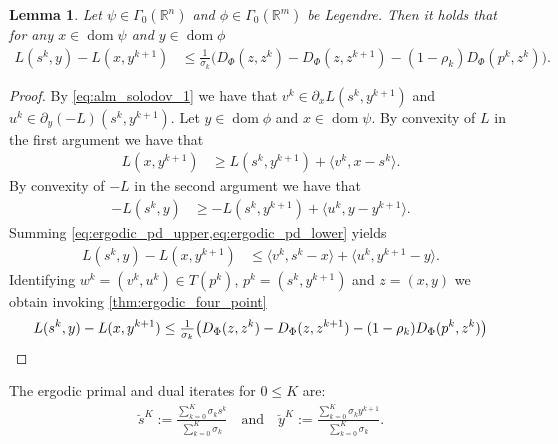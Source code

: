 \documentclass[11pt,onecolumn]{article}
\DeclareMathOperator{\dom}{dom}
\newcommand{\bR}{\mathbb{R}}
\newtheorem{lemma}[lemma]{Lemma}
\theoremstyle{remark}
\begin{document}
\begin{lemma} \label{thm:ergodic_pd_fixed}
    Let $\psi \in \Gamma_0(\bR^n)$ and $\phi \in \Gamma_0(\bR^m)$ be Legendre. Then it holds that for any $x \in \dom \psi$ and $y \in \dom \phi$
\begin{align}
    L(s^{k}, y) -L(x, y^{k+1})&\leq \tfrac{1}{\sigma_k}\big(D_\Phi(z,z^k) -  D_\Phi(z,z^{k+1}) - (1-\rho_k) D_\Phi(p^k,z^{k})\big).
\end{align}
\end{lemma}
\begin{proof}
By \cref{eq:alm_solodov_1} we have that $v^{k} \in \partial_x L(s^{k}, y^{k+1})$ and $u^{k} \in \partial_y (-L)(s^{k}, y^{k+1})$. 
Let $y \in \dom \phi$ and $x \in\dom \psi$. By convexity of $L$ in the first argument we have that
\begin{align} \label{eq:ergodic_pd_upper}
L(x, y^{k+1}) &\geq L(s^{k}, y^{k+1}) + \langle v^{k}, x - s^{k} \rangle.
\end{align}
By convexity of $-L$ in the second argument we have that
\begin{align} \label{eq:ergodic_pd_lower}
-L(s^{k}, y) &\geq -L(s^{k}, y^{k+1}) + \langle u^{k}, y - y^{k+1} \rangle.
\end{align}
Summing \cref{eq:ergodic_pd_upper,eq:ergodic_pd_lower} yields
\begin{align}
    L(s^{k}, y) -L(x, y^{k+1})&\leq \langle v^{k},  s^{k}-x \rangle + \langle u^{k}, y^{k+1}-y \rangle.
\end{align}
Identifying $w^k=(v^k,u^k) \in T(p^k)$, $p^k=(s^k, y^{k+1})$ and $z=(x,y)$ we obtain invoking \cref{thm:ergodic_four_point} 
\[
    L(s^{k}, y) -L(x, y^{k+1})\leq \tfrac{1}{\sigma_k}\big(D_\Phi(z,z^k) -  D_\Phi(z,z^{k+1}) - (1-\rho_k) D_\Phi(p^k,z^{k})\big) \qedhere
\]
\end{proof}

The ergodic primal and dual iterates for $0 \leq K$ are:
\begin{align}
    \breve s^K := \frac{\sum_{k=0}^{K} \sigma_k s^{k}}{\sum_{k=0}^{K} \sigma_k} \quad \text{and} \quad \breve y^K:= \frac{\sum_{k=0}^{K} \sigma_k y^{k+1}}{\sum_{k=0}^{K} \sigma_k}.
\end{align}
\end{document}
